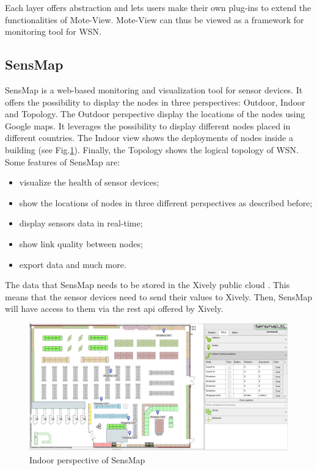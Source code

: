 Each layer offers abstraction and lets users make their own plug-ins to extend the functionalities of Mote-View. Mote-View can thus be viewed as a framework for monitoring tool for WSN.

\subsection{SensMap}

SensMap \cite{mraz2014visualization} is a web-based monitoring and visualization tool for sensor devices. It offers the possibility to display the nodes in three perspectives: Outdoor, Indoor and Topology. The Outdoor perspective display the locations of the nodes using Google maps. It leverages the possibility to display different nodes placed in different countries. The Indoor view shows the deployments of nodes inside a building (see Fig.\ref{fig:sensmap}). Finally, the Topology shows the logical topology of WSN.\\

Some features of SensMap are:

\begin{itemize}
  \item visualize the health of sensor devices;
  \item show the locations of nodes in three different perspectives as described before;
  \item display sensors data in real-time;
  \item show link quality between nodes;
  \item export data and much more.
\end{itemize}

The data that SensMap needs to be stored in the Xively public cloud \cite{website:xively}. This means that the sensor devices need to send their values to Xively. Then, SensMap will have access to them via the \acrshort{rest} api offered by Xively.

\begin{figure}
  \centering
  \includegraphics[width=\textwidth]{res/sensmap.jpg}
  \caption{Indoor perspective of SensMap}
  \label{fig:sensmap}
\end{figure}

